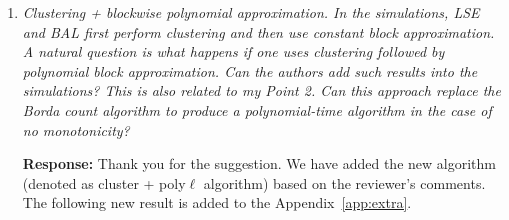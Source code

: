 \documentclass[11pt]{article}
\theoremstyle{plain}
\theoremstyle{definition}
\begin{document}
\begin{enumerate}[wide, labelwidth=!, labelindent=0pt]
 \begin{table}[h!]
    \centering
    \caption{Comparison of our results with previous work. \color{blue}For simplicity, we omit the log term in the rate. $^{*}$The optimality is achieved under extra Lipchitz monotonicity conditions. Our method allows arbitrary smoothness level $\alpha>0$; see Sections 3-4 for details.}
 \label{tab:comp}
\end{table}


    \item \textit{Clustering + blockwise polynomial approximation. In the simulations, LSE and BAL first perform clustering and then use constant block approximation. A natural question is what happens if one uses clustering followed by polynomial block approximation. Can the authors add such results into the simulations?
    This is also related to my Point 2. Can this approach replace the Borda count algorithm to produce a polynomial-time algorithm in the case of no monotonicity?
}
  
   \textbf{Response:}
   Thank you for the suggestion. We have added the new algorithm (denoted as cluster + poly$\ell$ algorithm) based on the reviewer's comments. 
The following new result is added to the Appendix~\ref{app:extra}.   
   

\end{enumerate}
\end{document}
